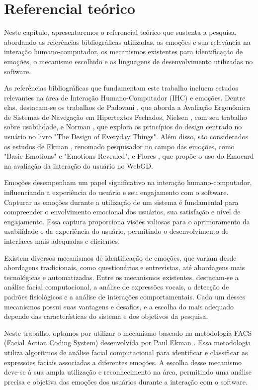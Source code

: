 \chapter{Referencial teórico}

Neste capítulo, apresentaremos o referencial teórico que sustenta a pesquisa, abordando as referências bibliográficas utilizadas, as emoções e sua relevância na interação humano-computador, os mecanismos existentes para identificação de emoções, o mecanismo escolhido e as linguagens de desenvolvimento utilizadas no software.

As referências bibliográficas que fundamentam este trabalho incluem estudos relevantes na área de Interação Humano-Computador (IHC) e emoções. Dentre elas, destacam-se os trabalhos de Padovani \cite{1}, que aborda a Avaliação Ergonômica de Sistemas de Navegação em Hipertextos Fechados, Nielsen \cite{2}, com seu trabalho sobre usabilidade, e Norman \cite{6}\cite{7}, que explora os princípios do design centrado no usuário no livro "The Design of Everyday Things". Além disso, são considerados os estudos de Ekman \cite{4}\cite{5}, renomado pesquisador no campo das emoções, como "Basic Emotions" e "Emotions Revealed", e Flores \cite{3}, que propõe o uso do Emocard na avaliação da interação do usuário no WebGD.

Emoções desempenham um papel significativo na interação humano-computador, influenciando a experiência do usuário e seu engajamento com o software. Capturar as emoções durante a utilização de um sistema é fundamental para compreender o envolvimento emocional dos usuários, sua satisfação e nível de engajamento. Essa captura proporciona visões valiosas para o aprimoramento da usabilidade e da experiência do usuário, permitindo o desenvolvimento de interfaces mais adequadas e eficientes.

Existem diversos mecanismos de identificação de emoções, que variam desde abordagens tradicionais, como questionários e entrevistas, até abordagens mais tecnológicas e automatizadas. Entre os mecanismos existentes, destacam-se a análise facial computacional, a análise de expressões vocais, a detecção de padrões fisiológicos e a análise de interações comportamentais. Cada um desses mecanismos possui suas vantagens e desafios, e a escolha do mais adequado depende das características do sistema e dos objetivos da pesquisa.

Neste trabalho, optamos por utilizar o mecanismo baseado na metodologia FACS (Facial Action Coding System) desenvolvida por Paul Ekman \cite{5}. Essa metodologia utiliza algoritmos de análise facial computacional para identificar e classificar as expressões faciais associadas a diferentes emoções. A escolha desse mecanismo deve-se à sua ampla utilização e reconhecimento na área, permitindo uma análise precisa e objetiva das emoções dos usuários durante a interação com o software.

